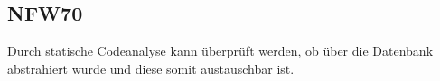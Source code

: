 \subsection*{NFW70}

Durch statische Codeanalyse kann überprüft werden, ob über die Datenbank abstrahiert wurde und diese somit austauschbar ist.